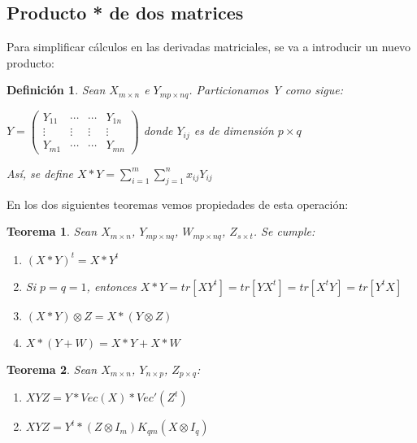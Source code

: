 \documentclass{article}
\theoremstyle{theorem-style}  %
\newtheorem{theorem}{Teorema}[section]  %
\theoremstyle{definition-style}
\newtheorem{definition}{Definición}[section]
\theoremstyle{example-style}
\theoremstyle{exercise-style}
\begin{document}
	\newpage
	
	\subsection{Producto * de dos matrices}
	Para simplificar cálculos en las derivadas matriciales, se va a introducir un nuevo producto: 
	
	\begin{definition}
		Sean $X_{m \times n}$ e $Y_{mp \times nq} $. Particionamos Y como sigue:
		
		$Y=\left( \begin{matrix}
		Y_{11} & \cdots & \cdots & Y_{1n}\\
		\vdots & \vdots & \vdots & \vdots \\
		Y_{m1} & \cdots & \cdots & Y_{mn} \end{matrix} \right)$ donde $Y_{ij}$ es de dimensión $p \times q$
		
		Así, se define $X*Y = \sum_{i=1}^{m}\sum_{j=1}^{n} x_{ij}Y_{ij}$ 
		
	\end{definition}
	
	En los dos siguientes teoremas vemos propiedades de esta operación:
	
	\begin{theorem}
		Sean $X_{m \times n}$, $Y_{mp \times nq}$, $W_{mp \times nq}$, $Z_{s \times t}$. Se cumple:
		\begin{enumerate}
			
			\item $(X*Y)^t=X*Y^t$
			
			\item Si $p=q=1$, entonces $X*Y =tr[XY^t]=tr[YX^t]=tr[X^tY]=tr[Y^tX]$
			
			\item $(X*Y) \otimes Z = X * (Y \otimes Z)$
			
			\item $X * (Y+W) = X*Y + X*W$
			
		\end{enumerate}	
	\end{theorem}
	
	\begin{theorem}
		Sean $X_{m \times n}$, $Y_{n \times p}$, $Z_{p \times q}$:
		
		\begin{enumerate}
			\item $XYZ= Y*Vec(X)*Vec'(Z^t)$
			
			\item $ XYZ = Y^t * (Z \otimes I_m)K_{qm}(X \otimes I_q)$ 
		\end{enumerate}
	\end{theorem}
	
\end{document}

